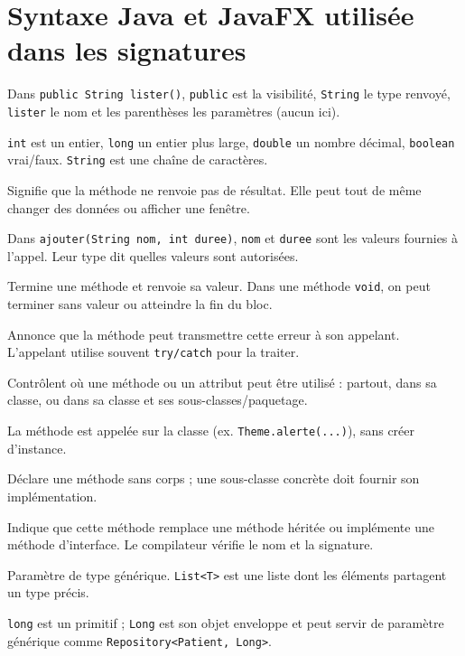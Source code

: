 \documentclass[11pt,a4paper]{report}
\begin{document}
\section{Syntaxe Java et JavaFX utilisée dans les signatures}
\begin{description}[leftmargin=3.5cm,style=nextline]
\item[Signature] Dans \texttt{public String lister()}, \texttt{public} est la visibilité, \texttt{String} le type renvoyé, \texttt{lister} le nom et les parenthèses les paramètres (aucun ici).
\item[Types primitifs] \texttt{int} est un entier, \texttt{long} un entier plus large, \texttt{double} un nombre décimal, \texttt{boolean} vrai/faux. \texttt{String} est une chaîne de caractères.
\item[\texttt{void}] Signifie que la méthode ne renvoie pas de résultat. Elle peut tout de même changer des données ou afficher une fenêtre.
\item[Paramètres] Dans \texttt{ajouter(String nom, int duree)}, \texttt{nom} et \texttt{duree} sont les valeurs fournies à l'appel. Leur type dit quelles valeurs sont autorisées.
\item[\texttt{return}] Termine une méthode et renvoie sa valeur. Dans une méthode \texttt{void}, on peut terminer sans valeur ou atteindre la fin du bloc.
\item[\texttt{throws TypeException}] Annonce que la méthode peut transmettre cette erreur à son appelant. L'appelant utilise souvent \texttt{try/catch} pour la traiter.
\item[\texttt{public/private/protected}] Contrôlent où une méthode ou un attribut peut être utilisé : partout, dans sa classe, ou dans sa classe et ses sous-classes/paquetage.
\item[\texttt{static}] La méthode est appelée sur la classe (ex. \texttt{Theme.alerte(...)}), sans créer d'instance.
\item[\texttt{abstract}] Déclare une méthode sans corps ; une sous-classe concrète doit fournir son implémentation.
\item[\texttt{@Override}] Indique que cette méthode remplace une méthode héritée ou implémente une méthode d'interface. Le compilateur vérifie le nom et la signature.
\item[\texttt{<T>}] Paramètre de type générique. \texttt{List<T>} est une liste dont les éléments partagent un type précis.
\item[\texttt{Long} et \texttt{long}] \texttt{long} est un primitif ; \texttt{Long} est son objet enveloppe et peut servir de paramètre générique comme \texttt{Repository<Patient, Long>}.

\end{description}
\end{document}
